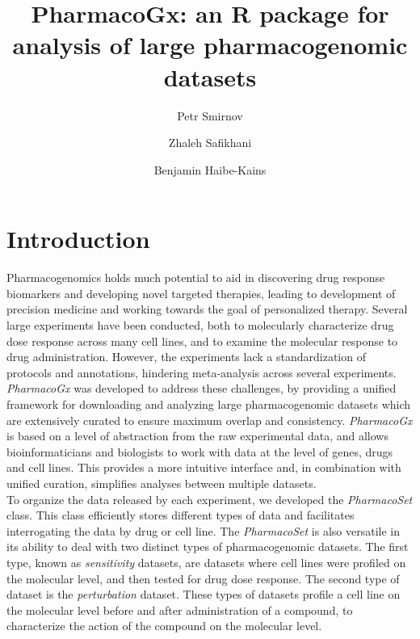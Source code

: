 \documentclass[11pt]{article}
\title{PharmacoGx: an R package for analysis of large pharmacogenomic datasets}
\author[1]{Petr Smirnov}
\author[1,2]{Zhaleh Safikhani}
\author[1,2,3]{Benjamin Haibe-Kains}
\affil[1]{Princess Margaret Cancer Centre, University Health Network, Toronto Canada}
\affil[2]{Department of Medical Biophysics, University of Toronto, Toronto Canada}
\affil[3]{Department of Computer Science, University of Toronto, Toronto Canada}
\begin{document}


\maketitle
\tableofcontents

\section{Introduction}

Pharmacogenomics holds much potential to aid in discovering drug response
biomarkers and developing novel targeted therapies, leading to development of
precision medicine and working towards the goal of personalized therapy.
Several large experiments have been conducted, both to molecularly
characterize drug dose response across many cell lines, and to examine the
molecular response to drug administration. However, the experiments lack a
standardization of protocols and annotations, hindering meta-analysis across
several experiments.\\

\textit{PharmacoGx} was developed to address these challenges, by providing a
unified framework for downloading and analyzing large pharmacogenomic datasets
which are extensively curated to ensure maximum overlap and consistency.
\textit{PharmacoGx} is based on a level of abstraction from the raw
experimental data, and allows bioinformaticians and biologists to work with
data at the level of genes, drugs and cell lines. This provides a more
intuitive interface and, in combination with unified curation, simplifies
analyses between multiple datasets.\\

To organize the data released by each experiment, we developed the
\textit{PharmacoSet} class. This class efficiently stores different types of
data and facilitates interrogating the data by drug or cell line. The
\textit{PharmacoSet} is also versatile in its ability to deal with two
distinct types of pharmacogenomic datasets. The first type, known as
\textit{sensitivity} datasets, are datasets where cell lines were profiled
on the molecular level, and then tested for drug dose response. The second
type of dataset is the \textit{perturbation} dataset. These types of
datasets profile a cell line on the molecular level before and after
administration of a compound, to characterize the action of the compound on
the molecular level.\\
\end{document}
